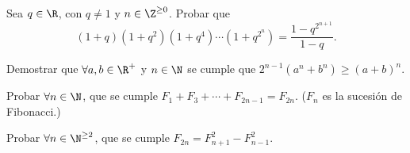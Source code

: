     \begin{section-problem}
        Sea $q \in \R$, con $q \neq 1$ y $n \in \Z^{\geq 0}$.
        Probar que
        \[(1 + q)(1 + q^2)(1 + q^4)\cdots(1 + q^{2^n}) = \frac{1 - q^{2^{n + 1}} }{1 - q}.\]
    \end{section-problem}

    \begin{section-problem}
        Demostrar que $\forall a, b\in \R^+$ y $n \in \N$ se cumple que $2^{n - 1}(a^n + b^n) \geq (a + b)^n.$
    \end{section-problem}

    \begin{section-problem}
        Probar $\forall n \in \N$, que se cumple $F_1 + F_3 + \cdots + F_{2n - 1} = F_{2n}.$ ($F_n$ es la sucesión de Fibonacci.)
    \end{section-problem}

    \begin{section-problem}
        Probar $\forall n \in \N^{\geq 2}$, que se cumple $F_{2n} = F_{n + 1}^2 - F_{n - 1}^2.$
    \end{section-problem}